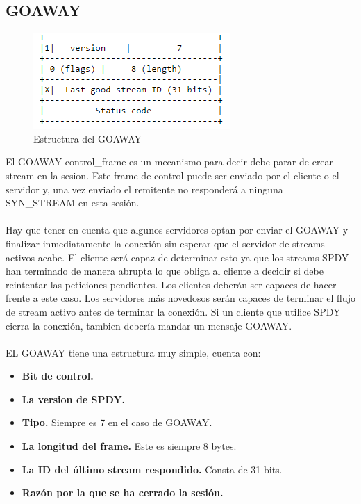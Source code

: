 \subsection{GOAWAY}
\begin{figure}[H] %
\includegraphics[scale=1]{goaway.png}  %
\centering
\caption{Estructura del GOAWAY} \label{fig:figura6}
\end{figure}
El GOAWAY control\_frame es un mecanismo para decir debe parar de crear stream en la sesion. Este frame de control puede ser enviado por el cliente o el servidor y, una vez enviado el remitente no responderá a ninguna SYN\_STREAM en esta sesión.
\\
\\
Hay que tener en cuenta que algunos servidores optan por enviar el GOAWAY y finalizar inmediatamente la conexión sin esperar que el servidor de streams activos acabe. El cliente será capaz de determinar esto ya que los streams SPDY han terminado de manera abrupta lo que obliga al cliente a decidir si debe reintentar las peticiones pendientes. Los clientes deberán ser capaces de hacer frente a este caso.
Los servidores más novedosos serán capaces de terminar el flujo de stream activo antes de terminar la conexión.
Si un cliente que utilice SPDY cierra la conexión, tambien debería mandar un mensaje GOAWAY.
\\
\\
EL GOAWAY tiene una estructura muy simple, cuenta con:
\begin{itemize}
 \item \textbf{Bit de control.}
 \item \textbf{La version de SPDY.}
 \item \textbf{Tipo.} Siempre es 7 en el caso de GOAWAY.
 \item \textbf{La longitud del frame.} Este es siempre 8 bytes.
 \item \textbf{La ID del último stream respondido.} Consta de 31 bits.
 \item \textbf{Razón por la que se ha cerrado la sesión.}
\end{itemize}

